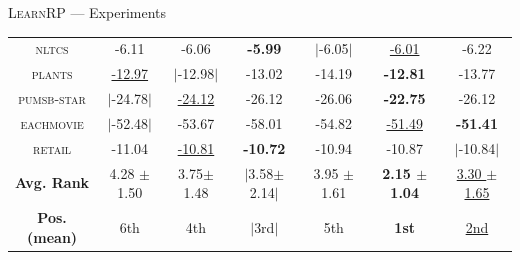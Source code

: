 \documentclass[aspectratio=169]{beamer}
\newenvironment{vhcenterb}{\vspace*{\fill}\begin{center}}{\end{center}\vspace*{\fill}}
\begin{document}
\begin{frame}[fragile]{\textsc{LearnRP} --- Experiments}
\begin{vhcenterb}
{{\begin{tabular}{c|ccccc|c}
    \textsc{nltcs} & -6.11 & -6.06 & \textbf{-5.99} & $|$-6.05$|$ & \underline{-6.01} & -6.22\\
    \textsc{plants} & \underline{-12.97} & $|$-12.98$|$ & -13.02 & -14.19 & \textbf{-12.81} & -13.77\\
    \textsc{pumsb-star} & $|$-24.78$|$ & \underline{-24.12} & -26.12 & -26.06 & \textbf{-22.75} & -26.12\\
    \textsc{eachmovie} & $|$-52.48$|$ & -53.67 & -58.01 & -54.82 & \underline{-51.49} & \textbf{-51.41}\\
    \textsc{retail} & -11.04 & \underline{-10.81} & \textbf{-10.72} & -10.94 & -10.87 & $|$-10.84$|$\\
    \hline
    \textbf{Avg. Rank} & 4.28 $\pm$ 1.50 & 3.75$ \pm$ 1.48 & $|$3.58$ \pm$ 2.14$|$ & 3.95 $\pm$ 1.61 & \textbf{2.15 $\pm$ 1.04} & \underline{3.30 $\pm$ 1.65}\\
    \hline
    \textbf{Pos. (mean)} & 6th & 4th & $|$3rd$|$ & 5th & \textbf{1st} & \underline{2nd} \\
    \hline
  \end{tabular}
  }
  }
\end{vhcenterb}
\end{frame}

\end{document}
